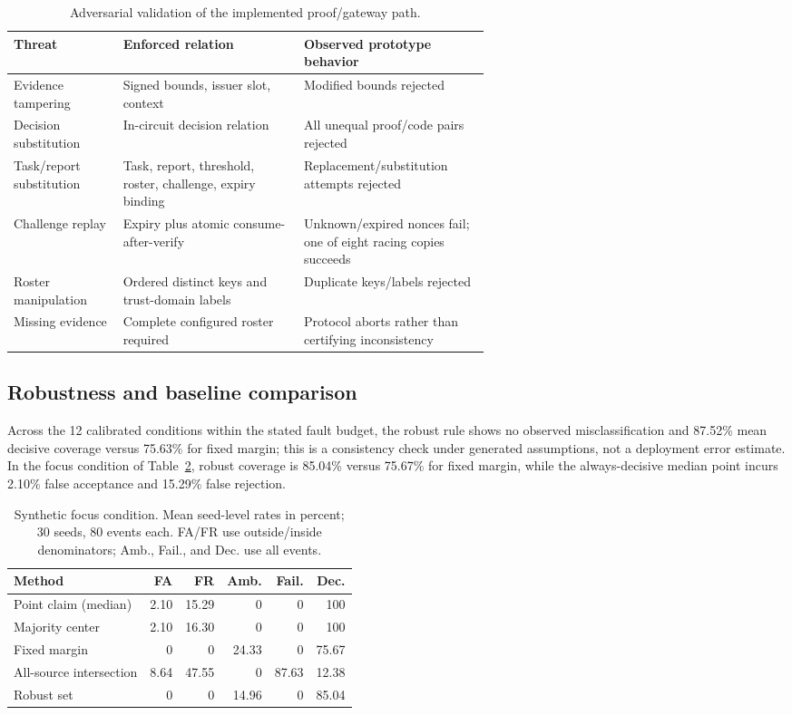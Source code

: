 \documentclass[preprint,review,12pt]{elsarticle}
\begin{document}
\begin{table}[htbp]
\centering\small
\caption{Adversarial validation of the implemented proof/gateway path.}
\label{tab:security-validation}
\begin{tabularx}{\linewidth}{@{}>{\raggedright\arraybackslash}p{0.23\linewidth}>{\raggedright\arraybackslash}p{0.38\linewidth}>{\raggedright\arraybackslash}X@{}}
\toprule
Threat & Enforced relation & Observed prototype behavior\\
\midrule
Evidence tampering & Signed bounds, issuer slot, context & Modified bounds rejected\\
Decision substitution & In-circuit decision relation & All unequal proof/code pairs rejected\\
Task/report substitution & Task, report, threshold, roster, challenge, expiry binding & Replacement/substitution attempts rejected\\
Challenge replay & Expiry plus atomic consume-after-verify & Unknown/expired nonces fail; one of eight racing copies succeeds\\
Roster manipulation & Ordered distinct keys and trust-domain labels & Duplicate keys/labels rejected\\
Missing evidence & Complete configured roster required & Protocol aborts rather than certifying inconsistency\\
\bottomrule
\end{tabularx}
\end{table}

\subsection{Robustness and baseline comparison}
Across the 12 calibrated conditions within the stated fault budget, the robust rule shows no observed misclassification and 87.52\% mean decisive coverage versus 75.63\% for fixed margin; this is a consistency check under generated assumptions, not a deployment error estimate. In the focus condition of Table~\ref{tab:semantic}, robust coverage is 85.04\% versus 75.67\% for fixed margin, while the always-decisive median point incurs 2.10\% false acceptance and 15.29\% false rejection.

\begin{table}[htbp]
\centering\small
\caption{Synthetic focus condition. Mean seed-level rates in percent; 30 seeds, 80 events each. FA/FR use outside/inside denominators; Amb., Fail., and Dec. use all events.}\label{tab:semantic}
\begin{tabular}{lrrrrr}
\toprule Method&FA&FR&Amb.&Fail.&Dec.\\\midrule
Point claim (median)&2.10&15.29&0&0&100\\
Majority center&2.10&16.30&0&0&100\\
Fixed margin&0&0&24.33&0&75.67\\
All-source intersection&8.64&47.55&0&87.63&12.38\\
Robust set&0&0&14.96&0&85.04\\\bottomrule
\end{tabular}
\end{table}
\end{document}

